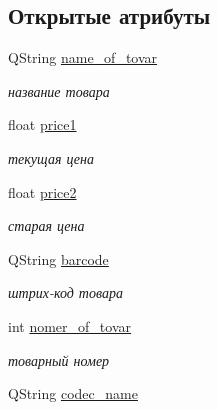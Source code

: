 \subsection*{Открытые атрибуты}
\begin{DoxyCompactItemize}
\item 
\hypertarget{struct_tovar_a0558b5260c83faf4e7aa0e832025d590}{\-Q\-String \hyperlink{struct_tovar_a0558b5260c83faf4e7aa0e832025d590}{name\-\_\-of\-\_\-tovar}}\label{struct_tovar_a0558b5260c83faf4e7aa0e832025d590}

\begin{DoxyCompactList}\small\item\em название товара \end{DoxyCompactList}\item 
\hypertarget{struct_tovar_a23aee907302c0340de9dc722444d204b}{float \hyperlink{struct_tovar_a23aee907302c0340de9dc722444d204b}{price1}}\label{struct_tovar_a23aee907302c0340de9dc722444d204b}

\begin{DoxyCompactList}\small\item\em текущая цена \end{DoxyCompactList}\item 
\hypertarget{struct_tovar_ac611856fa45875e8c1443477254c1613}{float \hyperlink{struct_tovar_ac611856fa45875e8c1443477254c1613}{price2}}\label{struct_tovar_ac611856fa45875e8c1443477254c1613}

\begin{DoxyCompactList}\small\item\em старая цена \end{DoxyCompactList}\item 
\hypertarget{struct_tovar_add3cd7c24dc5c28062a5d4c6fe42b04b}{\-Q\-String \hyperlink{struct_tovar_add3cd7c24dc5c28062a5d4c6fe42b04b}{barcode}}\label{struct_tovar_add3cd7c24dc5c28062a5d4c6fe42b04b}

\begin{DoxyCompactList}\small\item\em штрих-\/код товара \end{DoxyCompactList}\item 
\hypertarget{struct_tovar_a482dd26f52f0f5cf87c19a040d4ccefb}{int \hyperlink{struct_tovar_a482dd26f52f0f5cf87c19a040d4ccefb}{nomer\-\_\-of\-\_\-tovar}}\label{struct_tovar_a482dd26f52f0f5cf87c19a040d4ccefb}

\begin{DoxyCompactList}\small\item\em товарный номер \end{DoxyCompactList}\item 
\hypertarget{struct_tovar_a0c6ccedf9c913bee32443e26de7a19c3}{\-Q\-String \hyperlink{struct_tovar_a0c6ccedf9c913bee32443e26de7a19c3}{codec\-\_\-name}}\label{struct_tovar_a0c6ccedf9c913bee32443e26de7a19c3}


\end{DoxyCompactItemize}
